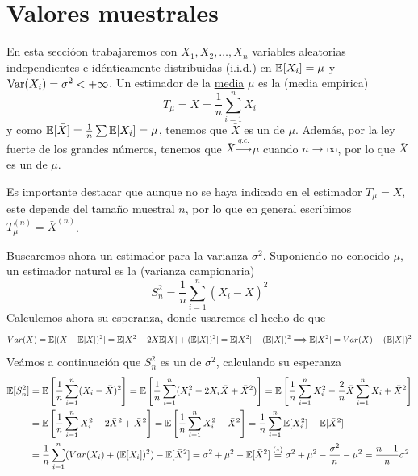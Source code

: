 \section{Valores muestrales}
\noindent
En esta seccióon trabajaremos con $X_1, X_2, \ldots, X_n$ variables aleatorias independientes e idénticamente distribuidas (i.i.d.) cn $\mathbb{E}[X_i] = \mu$ y $\operatorname{Var}(X_i) = \sigma^2 < +\infty$. Un estimador de la \underline{media} $\mu$ es la  (media empirica)
\begin{equation*}
    T_{\mu}=\bar{X} = \dfrac{1}{n} \sum\limits_{i=1}^{n} X_i
\end{equation*}
y como $\mathbb{E}[\bar{X}]=\frac{1}{n} \sum \mathbb{E}[X_i] = \mu$, tenemos que $\bar{X}$ es un  de $\mu$. Además, por la ley fuerte de los grandes números, tenemos que $\bar{X} \xrightarrow{q.c.} \mu$ cuando $n\to \infty$, por lo que $\bar{X}$ es un  de $\mu$.
\begin{observacion}
    Es importante destacar que aunque no se haya indicado en el estimador $T_{\mu}=\bar{X}$, este depende del tamaño muestral $n$, por lo que en general escribimos $T_{\mu}^{(n)}=\bar{X}^{(n)}$. \\
\end{observacion}
\noindent 
Buscaremos ahora un estimador para la \underline{varianza} $\sigma^2$. Suponiendo no conocido $\mu$, un estimador natural es la  (varianza campionaria)
\begin{equation*}
    S_n^2 = \dfrac{1}{n} \sum\limits_{i=1}^{n} (X_i - \bar{X})^2
\end{equation*}
Calculemos ahora su esperanza, donde usaremos el hecho de que 
\begin{equation*}
    Var(X)=\mathbb{E}[(X - \mathbb{E}[X])^2] = \mathbb{E}[X^2- 2X\mathbb{E}[X] + (\mathbb{E}[X])^2] = \mathbb{E}[X^2] - (\mathbb{E}[X])^2 \Longrightarrow \mathbb{E}[X^2] = Var(X) + (\mathbb{E}[X])^2
\end{equation*}
Veámos a continuación que $S_n^2$ es un  de $\sigma^2$, calculando su esperanza
\begin{align*}
    \mathbb{E}[S_n^2] &= \mathbb{E}\left[\dfrac{1}{n} \sum\limits_{i=1}^{n} (X_i - \bar{X})^2\right] = \mathbb{E}\left[ \dfrac{1}{n} \sum\limits_{i=1}^{n} (X_i^2 - 2X_i\bar{X} + \bar{X}^2)\right] = \mathbb{E}\left[\dfrac{1}{n} \sum\limits_{i=1}^{n} X_i^2 - \dfrac{2}{n} \bar{X} \sum\limits_{i=1}^{n} X_i + \bar{X}^2\right] \\
    & = \mathbb{E}\left[\dfrac{1}{n} \sum\limits_{i=1}^{n} X_i^2 - 2\bar{X}^2 + \bar{X}^2\right] = \mathbb{E}\left[\dfrac{1}{n} \sum\limits_{i=1}^{n} X_i^2 - \bar{X}^2\right] = \dfrac{1}{n} \sum\limits_{i=1}^{n} \mathbb{E}[X_i^2] - \mathbb{E}[\bar{X}^2] \\
    & = \dfrac{1}{n} \sum\limits_{i=1}^{n} (Var(X_i) + (\mathbb{E}[X_i])^2) - \mathbb{E}[\bar{X}^2]= \sigma^2 + \mu^2 - \mathbb{E}[\bar{X}^2] \overset{(*)}{=} \sigma^2 + \mu^2 - \dfrac{\sigma^2}{n} - \mu^2 = \dfrac{n-1}{n} \sigma^2
\end{align*}
